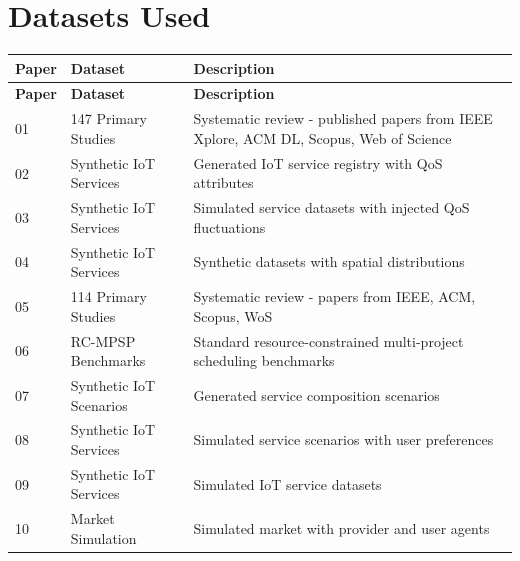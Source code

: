 \documentclass[12pt]{article}
\begin{document}
\section{Datasets Used}

\begin{longtable}{|p{1cm}|p{3.5cm}|p{5cm}|}
	\toprule
	\textbf{Paper} & \textbf{Dataset}                  & \textbf{Description}                                                                  \\
	\midrule
	\endfirsthead
	\toprule
	\textbf{Paper} & \textbf{Dataset}                  & \textbf{Description}                                                                  \\
	\midrule
	\endhead
	\midrule
	\endfoot
	\bottomrule
	\endlastfoot

	01             & 147 Primary Studies               & Systematic review - published papers from IEEE Xplore, ACM DL, Scopus, Web of Science \\
	02             & Synthetic IoT Services            & Generated IoT service registry with QoS attributes                                    \\
	03             & Synthetic IoT Services            & Simulated service datasets with injected QoS fluctuations                             \\
	04             & Synthetic IoT Services            & Synthetic datasets with spatial distributions                                         \\
	05             & 114 Primary Studies               & Systematic review - papers from IEEE, ACM, Scopus, WoS                                \\
	06             & RC-MPSP Benchmarks                & Standard resource-constrained multi-project scheduling benchmarks                     \\
	07             & Synthetic IoT Scenarios           & Generated service composition scenarios                                               \\
	08             & Synthetic IoT Services            & Simulated service scenarios with user preferences                                     \\
	09             & Synthetic IoT Services            & Simulated IoT service datasets                                                        \\
	10             & Market Simulation                 & Simulated market with provider and user agents                                        \\

\end{longtable}
\end{document}
